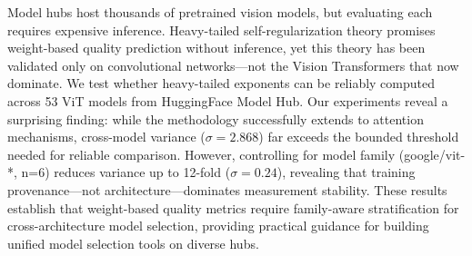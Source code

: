 Model hubs host thousands of pretrained vision models, but evaluating each requires expensive inference. Heavy-tailed self-regularization theory promises weight-based quality prediction without inference, yet this theory has been validated only on convolutional networks---not the Vision Transformers that now dominate. We test whether heavy-tailed exponents can be reliably computed across 53 ViT models from HuggingFace Model Hub. Our experiments reveal a surprising finding: while the methodology successfully extends to attention mechanisms, cross-model variance ($\sigma = 2.868$) far exceeds the bounded threshold needed for reliable comparison. However, controlling for model family (google/vit-*, n=6) reduces variance up to 12-fold ($\sigma = 0.24$), revealing that training provenance---not architecture---dominates measurement stability. These results establish that weight-based quality metrics require family-aware stratification for cross-architecture model selection, providing practical guidance for building unified model selection tools on diverse hubs.
